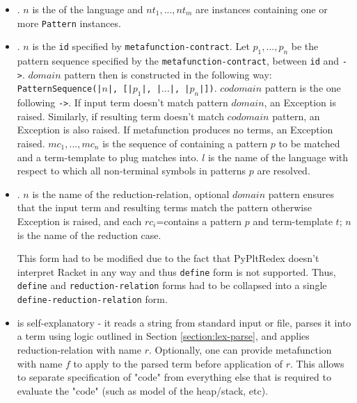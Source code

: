 \begin{itemize}
\item
\TlDefineLanguage. $n$ is the of the language and $nt_1,...,nt_m$ are \NtDefinitionN \space instances containing one or more \texttt{Pattern} instances.

\item
\TlDefineMetafunction. $n$ is the \texttt{id} specified by \texttt{metafunction-contract}. Let $p_1, ..., p_n$ be the pattern sequence specified by the \texttt{metafunction-contract}, between \texttt{id} and \texttt{->}. $domain$ pattern then is constructed in the following way: \texttt{PatternSequence(|$n$|, [|$p_1$|, |$...$|, |$p_n$|])}. $codomain$ pattern is the one following \texttt{->}. If input term doesn't match pattern $domain$, an Exception is raised. Similarly, if resulting term doesn't match $codomain$ pattern, an Exception is also raised. If metafunction produces no terms, an Exception raised. $mc_1,...,mc_n$ is the sequence of \MetafunctionCase containing a pattern $p$ to be matched and a term-template to plug matches into. $l$ is the name of the language with respect to which all non-terminal symbols in patterns $p$ are resolved.

\item \TlDefineReductionRelation. $n$ is the name of the reduction-relation, optional $domain$ pattern ensures that the input term and resulting terms match the pattern otherwise Exception is raised, and each $rc_i$=\ReductionCase contains a pattern $p$ and term-template $t$; $n$ is the name of the reduction case.

This form had to be modified due to the fact that PyPltRedex doesn't interpret Racket in any way and thus \texttt{define} form is not supported. Thus, \texttt{define} and \texttt{reduction-relation} forms had to be collapsed into a single \texttt{define-reduction-relation} form.

\item \ReadFromStdinAndApplyReductionRelation \space is self-explanatory -  it reads a string from standard input or file, parses it into a term using logic outlined in Section \ref{section:lex-parse}, and applies reduction-relation with name $r$. Optionally, one can provide metafunction with name $f$ to apply to the parsed term before application of $r$. This allows to separate specification of "code" from everything else that is required to evaluate the "code" (such as model of the heap/stack, etc).
\end{itemize}

